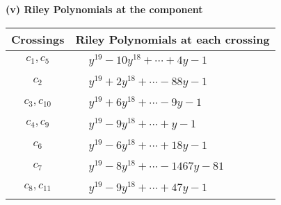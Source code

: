 \documentclass[1p]{elsarticle_modified}
\theoremstyle{definition}
\begin{document}
\newpage\renewcommand{\arraystretch}{1}
\flushleft \textbf{(v) Riley Polynomials at the component}\newline \\
\begin{tabular}{m{50pt}|m{274pt}}
Crossings & \hspace{64pt}Riley Polynomials at each crossing \\
\hline $$\begin{aligned}c_{1},c_{5}\end{aligned}$$&$\begin{aligned}
&y^{19}-10 y^{18}+\cdots+4 y-1
\end{aligned}$\\
\hline $$\begin{aligned}c_{2}\end{aligned}$$&$\begin{aligned}
&y^{19}+2 y^{18}+\cdots-88 y-1
\end{aligned}$\\
\hline $$\begin{aligned}c_{3},c_{10}\end{aligned}$$&$\begin{aligned}
&y^{19}+6 y^{18}+\cdots-9 y-1
\end{aligned}$\\
\hline $$\begin{aligned}c_{4},c_{9}\end{aligned}$$&$\begin{aligned}
&y^{19}-9 y^{18}+\cdots+y-1
\end{aligned}$\\
\hline $$\begin{aligned}c_{6}\end{aligned}$$&$\begin{aligned}
&y^{19}-6 y^{18}+\cdots+18 y-1
\end{aligned}$\\
\hline $$\begin{aligned}c_{7}\end{aligned}$$&$\begin{aligned}
&y^{19}-8 y^{18}+\cdots-1467 y-81
\end{aligned}$\\
\hline $$\begin{aligned}c_{8},c_{11}\end{aligned}$$&$\begin{aligned}
&y^{19}-9 y^{18}+\cdots+47 y-1
\end{aligned}$\\
\hline
\end{tabular}\\~\\
\end{document}
